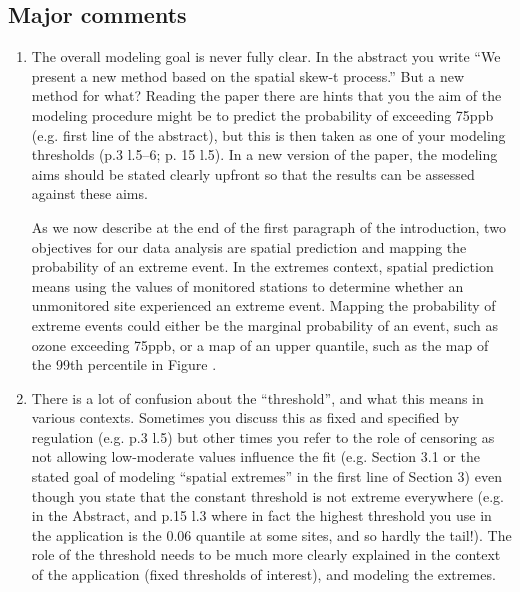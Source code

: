 \documentclass[11pt]{article}
\begin{document}
\subsection*{Major comments}
\begin{enumerate}[1.]
  \item The overall modeling goal is never fully clear. In the abstract you write ``We present a new method based on the spatial skew-t process.'' But a new method for what? Reading the paper there are hints that you the aim of the modeling procedure might be to predict the probability of exceeding 75ppb (e.g. first line of the abstract), but this is then taken as one of your modeling thresholds (p.3 l.5--6; p. 15 l.5). In a new version of the paper, the modeling aims should be stated clearly upfront so that the results can be assessed against these aims. \\

  \begin{response}
    As we now describe at the end of the first paragraph of the introduction, two objectives for our data analysis are spatial prediction and mapping the probability of an extreme event.
    In the extremes context, spatial prediction means using the values of monitored stations to determine whether an unmonitored site experienced an extreme event.
    Mapping the probability of extreme events could either be the marginal probability of an event, such as ozone exceeding 75ppb, or a map of an upper quantile, such as the map of the 99th percentile in Figure .
  \end{response}

  \item There is a lot of confusion about the ``threshold'', and what this means in various contexts. Sometimes you discuss this as fixed and specified by regulation (e.g. p.3 l.5) but other times you refer to the role of censoring as not allowing low-moderate values influence the fit (e.g. Section 3.1 or the stated goal of modeling ``spatial extremes'' in the first line of Section 3) even though you state that the constant threshold is not extreme everywhere (e.g. in the Abstract, and p.15 l.3 where in fact the highest threshold you use in the application is the 0.06 quantile at some sites, and so hardly the tail!). The role of the threshold needs to be much more clearly explained in the context of the application (fixed thresholds of interest), and modeling the extremes. \\


\end{enumerate}
\end{document}
